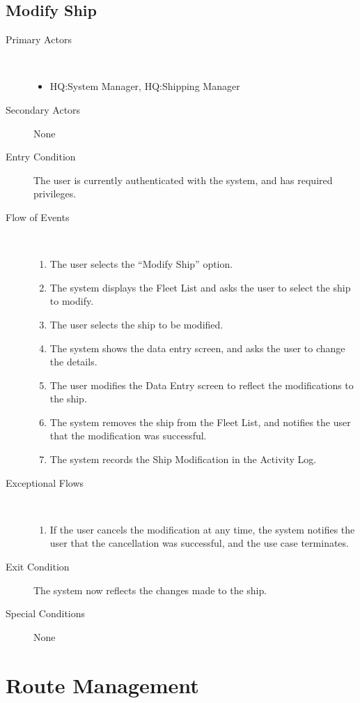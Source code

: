 \documentclass[a4paper,10pt]{report}
\begin{document}
\section{Modify Ship}
\begin{description}
\item[Primary Actors] \
  \begin{itemize}
  \item HQ:System Manager, HQ:Shipping Manager
  \end{itemize}
\item[Secondary Actors] None
\item[Entry Condition]
  The user is currently authenticated with the system, and has required privileges.
\item[Flow of Events] \
  \begin{enumerate}
  \item The user selects the ``Modify Ship'' option.
  \item The system displays the Fleet List and asks the user to select the ship to modify.
  \item The user selects the ship to be modified.
  \item The system shows the data entry screen, and asks the user to change the details.
  \item The user modifies the Data Entry screen to reflect the modifications to the ship.
  \item The system removes the ship from the Fleet List, and notifies the user that the modification was successful.
    \item The system records the Ship Modification in the Activity Log.
  \end{enumerate}
\item[Exceptional Flows] \
  \begin{enumerate}
  \item If the user cancels the modification at any time, the system notifies the user that the cancellation was successful, and the use case terminates.
  \end{enumerate}
\item[Exit Condition]
  The system now reflects the changes made to the ship.
\item[Special Conditions] None
\end{description}

\chapter{Route Management}
\end{document}
